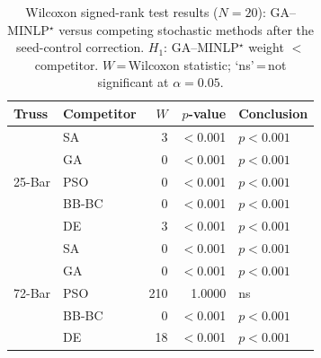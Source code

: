 \begin{table}[tbp]\centering
\caption{Wilcoxon signed-rank test results ($N=20$): GA--MINLP$^\star$ versus competing stochastic methods after the seed-control correction. $H_1$: GA--MINLP$^\star$ weight $<$ competitor. $W$\,=\,Wilcoxon statistic; `ns'\,=\,not significant at $\alpha=0.05$.}
\label{tab:wilcoxon}
\begin{tabular}{@{}llrrl@{}}\toprule
\textbf{Truss} & \textbf{Competitor} & $W$ & $p$-value & \textbf{Conclusion} \\
\midrule
\multirow{5}{*}{25-Bar} & SA & 3 & $<$0.001 & $p<0.001$ \\
 & GA & 0 & $<$0.001 & $p<0.001$ \\
 & PSO & 0 & $<$0.001 & $p<0.001$ \\
 & BB-BC & 0 & $<$0.001 & $p<0.001$ \\
 & DE & 3 & $<$0.001 & $p<0.001$ \\
\midrule
\multirow{5}{*}{72-Bar} & SA & 0 & $<$0.001 & $p<0.001$ \\
 & GA & 0 & $<$0.001 & $p<0.001$ \\
 & PSO & 210 & 1.0000 & ns \\
 & BB-BC & 0 & $<$0.001 & $p<0.001$ \\
 & DE & 18 & $<$0.001 & $p<0.001$ \\
\bottomrule\end{tabular}\end{table}